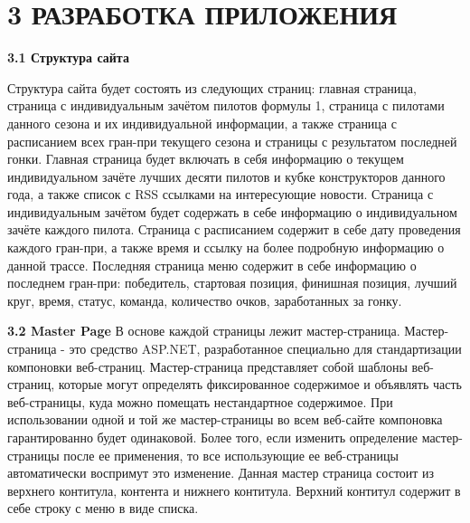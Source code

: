 \documentclass[14pt,a4paper]{extreport}
\begin{document}
	\newpage
	\section*{\normalsize\hspace{3ex} 3 РАЗРАБОТКА ПРИЛОЖЕНИЯ}
	
	
	
	\textbf{3.1 Структура сайта}
	
\flushleft\parindent=1cm Структура сайта будет состоять из следующих страниц: главная страница, страница с индивидуальным зачётом пилотов формулы 1, страница с пилотами данного сезона и их индивидуальной информации, а также страница с расписанием всех гран-при текущего сезона и страницы с результатом последней гонки. Главная страница будет включать в себя информацию о текущем индивидуальном зачёте лучших десяти пилотов и кубке конструкторов данного года, а также список с RSS ссылками на интересующие новости. Страница с индивидуальным зачётом будет содержать в себе информацию о индивидуальном зачёте каждого пилота. Страница с расписанием содержит в себе дату проведения каждого гран-при, а также время и ссылку на более подробную информацию о данной трассе. Последняя страница меню содержит в себе информацию о последнем гран-при: победитель, стартовая позиция, финишная позиция, лучший круг, время, статус, команда, количество очков, заработанных за гонку.\par
	
	
	\textbf{3.2 Master Page}
\flushleft\parindent=1cm В основе каждой страницы лежит мастер-страница. Мастер-страница - это средство ASP.NET, разработанное специально для стандартизации компоновки веб-страниц. Мастер-страница представляет собой шаблоны веб-страниц, которые могут определять фиксированное содержимое и объявлять часть веб-страницы, куда можно помещать нестандартное содержимое. При использовании одной и той же мастер-страницы во всем веб-сайте компоновка гарантированно будет одинаковой. Более того, если изменить определение мастер-страницы после ее применения, то все использующие ее веб-страницы автоматически воспримут это изменение.
	Данная мастер страница состоит из верхнего контитула, контента и нижнего контитула. Верхний контитул содержит в себе строку с меню в виде списка.\par
\end{document}
